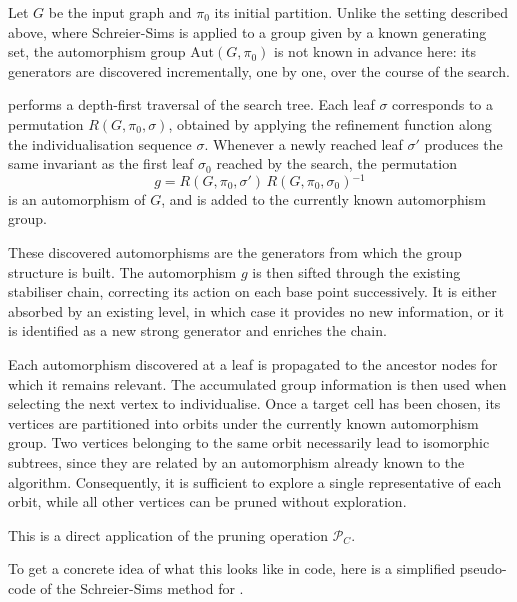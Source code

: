 Let $G$ be the input graph and $\pi_0$ its initial partition. Unlike
the setting described above, where Schreier-Sims is applied to a group
given by a known generating set, the automorphism group
$\mathrm{Aut}(G,\pi_0)$ is not known in advance here: its generators
are discovered incrementally, one by one, over the course of the search.

\Naut{} performs a depth-first traversal of the search tree. Each leaf
$\sigma$ corresponds to a permutation $R(G,\pi_0,\sigma)$, obtained
by applying the refinement function along the individualisation sequence
$\sigma$. Whenever a newly reached leaf $\sigma'$ produces the same
invariant as the first leaf $\sigma_0$ reached by the search, the permutation
\[
g = R(G,\pi_0,\sigma')\,R(G,\pi_0,\sigma_0){^{-1}}
\]
is an automorphism of $G$, and is added to the currently known
automorphism group.

These discovered automorphisms are the generators from which the group
structure is built. The automorphism $g$ is then sifted through the
existing stabiliser chain, correcting its action on each base point
successively. It is either absorbed by an existing level, in which case
it provides no new information, or it is identified as a new strong
generator and enriches the chain.

Each automorphism discovered at a leaf is propagated to the ancestor
nodes for which it remains relevant. The accumulated group information
is then used when selecting the next vertex to individualise. Once a
target cell has been chosen, its vertices are partitioned into orbits
under the currently known automorphism group. Two vertices belonging to
the same orbit necessarily lead to isomorphic subtrees, since they are
related by an automorphism already known to the algorithm. Consequently,
it is sufficient to explore a single representative of each orbit, while
all other vertices can be pruned without exploration.

This is a direct application of the pruning operation $\mathcal{P}_C$.

To get a concrete idea of what this looks like in code, here is a
simplified pseudo-code of the Schreier-Sims method for \Naut{}.

